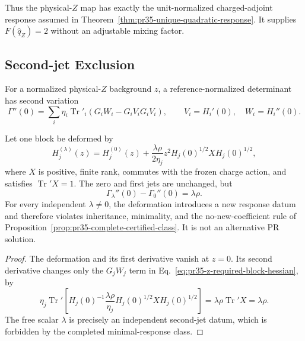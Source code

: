 Thus the physical-$Z$ map has exactly the unit-normalized charged-adjoint response assumed in Theorem~\ref{thm:pr35-unique-quadratic-response}.  It supplies $F(\widehat q_Z)=2$ without an adjustable mixing factor.

\subsection{Second-jet Exclusion}

For a normalized physical-$Z$ background $z$, a reference-normalized determinant has second variation
\begin{equation}
 \Gamma''(0)=\sum_i\eta_i\operatorname{Tr}'_i
 \left(G_iW_i-G_iV_iG_iV_i\right),
 \qquad V_i=H_i'(0),\quad W_i=H_i''(0).
 \label{eq:pr35-z-required-block-hessian}
\end{equation}

\begin{theorem}
\label{thm:pr35-z-second-jet-nonuniqueness}
Let one block be deformed by
\begin{equation}
 H_j^{(\lambda)}(z)=H_j^{(0)}(z)
 +\frac{\lambda\rho}{2\eta_j}z^2H_j(0)^{1/2}XH_j(0)^{1/2},
 \label{eq:pr35-z-second-jet-family}
\end{equation}
where $X$ is positive, finite rank, commutes with the frozen charge action, and satisfies $\operatorname{Tr}'X=1$.  The zero and first jets are unchanged, but
\begin{equation}
 \Gamma_\lambda''(0)-\Gamma_0''(0)=\lambda\rho.
 \label{eq:pr35-z-second-jet-shift}
\end{equation}
For every independent $\lambda\ne0$, the deformation introduces a new response datum and therefore violates inheritance, minimality, and the no-new-coefficient rule of
Proposition~\ref{prop:pr35-complete-certified-class}.  It is not an alternative PR solution.
\end{theorem}

\begin{proof}
The deformation and its first derivative vanish at $z=0$.  Its second derivative changes only the $G_jW_j$ term in Eq.~\eqref{eq:pr35-z-required-block-hessian}, by
\begin{equation}
 \eta_j\operatorname{Tr}'\!\left[
 H_j(0)^{-1}\frac{\lambda\rho}{\eta_j}
 H_j(0)^{1/2}XH_j(0)^{1/2}\right]
 =\lambda\rho\operatorname{Tr}'X=\lambda\rho.
\end{equation}
The free scalar $\lambda$ is precisely an independent second-jet datum, which is forbidden by the completed minimal-response class.
\end{proof}

